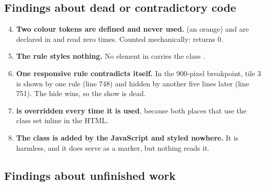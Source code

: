 \documentclass[11pt,a4paper]{article}
\begin{document}
\subsection{Findings about dead or contradictory code}

\begin{enumerate}\setcounter{enumi}{3}
\item \textbf{Two colour tokens are defined and never used.} 
  (an orange) and  are declared in  and read zero
  times. Counted mechanically:  returns 0.
\item \textbf{The rule  styles nothing.} No element in
   carries the class .
\item \textbf{One responsive rule contradicts itself.} In the 900-pixel
  breakpoint, tile 3 is shown by one rule (line 748) and hidden by another five
  lines later (line 751). The hide wins, so the show is dead.
\item \textbf{ is overridden every time it is
  used}, because both places that use the class set  inline
  in the HTML.
\item \textbf{The class  is added by the JavaScript and styled
  nowhere.} It is harmless, and it does serve as a marker, but nothing reads it.
\end{enumerate}

\subsection{Findings about unfinished work}
\end{document}
